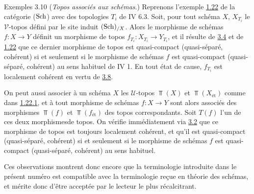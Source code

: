 \documentclass[10pt]{../fichiers-configuration-latex/smfart}
\begin{document}
\begin{enonce*}[remark]{Exemples 3.10}
(\emph{Topos associés aux schémas}.)
Reprenons l'exemple \hyperref[VI.subsec1.22]{1.22} de la catégorie ($\operatorname{Sch}$) avec des topologies
$T_i$ de \SGA IV 6.3. Soit, pour tout schéma $X$, $X_{T_i}$ le
$𝒱$-topos défini par le site induit $(\operatorname{Sch})_{/X}$. Alors le morphisme
de schémas $f : X \to Y$ définit un morphisme de topos $f_{T_i} :
X_{T_i} \to Y_{T_i}$, et il résulte de \hyperref[VI.prop3.4]{3.4} et de \hyperref[VI.subsec1.22]{1.22} que ce dernier
morphisme de topos est quasi-compact (\resp quasi-séparé, \resp
cohérent) si et seulement si le morphisme de schémas $f$ est
quasi-compact (\resp quasi-séparé, \resp cohérent) au sens habituel de
\EGA IV 1. En tout état de cause, $f_{T_i}$ est localement cohérent en
vertu de \hyperref[VI.cor3.8]{3.8}.

On peut aussi associer à un schéma $X$ les $𝒰$-topos $\Top(X)$ et
$\Top(X_{\text{ét}})$ comme dans \hyperref[VI.subsubsec1.22.1]{1.22.1}, et à tout morphisme de schémas $f :
X \to Y$ sont alors associés des morphismes $\Top(f)$ et
$\Top(f_{\text{ét}})$ des topos correspondants. Soit $T(f)$ l'un de ces deux
morphismes\pageoriginale de topos. On vérifie immédiatement via \hyperref[VI.prop3.2]{3.2}
que ce morphisme de topos est toujours localement cohérent, et qu'il est quasi-compact
(\resp quasi-séparé, \resp cohérent) si et seulement si le morphisme
de schémas $f$ est quasi-compact (\resp quasi-séparé, \resp cohérent)
au sens habituel.

Ces observations montrent donc encore que la terminologie introduite
dans le présent numéro est compatible avec la terminologie reçue en
théorie des schémas, et mérite donc d'être acceptée par le lecteur
le plus récalcitrant.
\end{enonce*}
\end{document}
